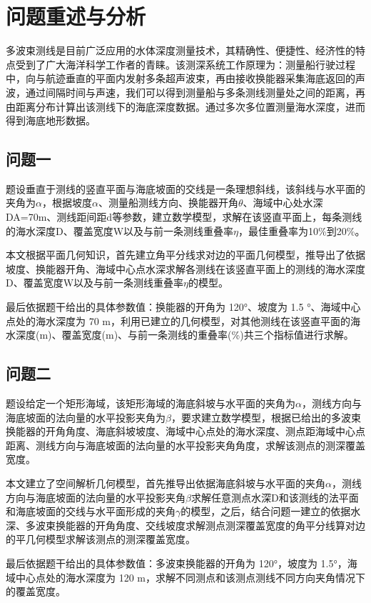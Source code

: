 \documentclass[withoutpreface,bwprint]{cumcmthesis} %
\begin{document}
\setcounter{page}{1}
\section{问题重述与分析}
多波束测线是目前广泛应用的水体深度测量技术，其精确性、便捷性、经济性的特点受到了广大海洋科学工作者的青睐。该测深系统工作原理为：测量船行驶过程中，向与航迹垂直的平面内发射多条超声波束，再由接收换能器采集海底返回的声波，通过间隔时间与声速，我们可以得到测量船与多条测线测量处之间的距离，再由距离分布计算出该测线下的海底深度数据。通过多次多位置测量海水深度，进而得到海底地形数据。

\subsection{问题一}
题设垂直于测线的竖直平面与海底坡面的交线是一条理想斜线，该斜线与水平面的夹角为$\alpha$，根据坡度$\alpha$、测量船测线方向、换能器开角$\theta$、海域中心处水深DA=70m、测线距间距d等参数，建立数学模型，求解在该竖直平面上，每条测线的海水深度D、覆盖宽度W以及与前一条测线重叠率$\eta$，最佳重叠率为10\%到20\%。

本文根据平面几何知识，首先建立角平分线求对边的平面几何模型，推导出了依据坡度、换能器开角、海域中心点水深求解各测线在该竖直平面上的测线的海水深度D、覆盖宽度W以及与前一条测线重叠率$\eta$的模型。

最后依据题干给出的具体参数值：换能器的开角为 120°、坡度为 1.5 °、海域中心点处的海水深度为 70 m，利用已建立的几何模型，对其他测线在该竖直平面的海水深度(m)、覆盖宽度(m)、与前一条测线的重叠率(\%)共三个指标值进行求解。

\subsection{问题二}
题设给定一个矩形海域，该矩形海域的海底斜坡与水平面的夹角为$\alpha$，测线方向与海底坡面的法向量的水平投影夹角为$\beta$，要求建立数学模型，根据已给出的多波束换能器的开角角度、海底斜坡坡度、海域中心点处的海水深度、测点距海域中心点距离、测线方向与海底坡面的法向量的水平投影夹角角度，求解该测点的测深覆盖宽度。

本文建立了空间解析几何模型，首先推导出依据海底斜坡与水平面的夹角$\alpha$，测线方向与海底坡面的法向量的水平投影夹角$\beta$求解任意测点水深D和该测线的法平面和海底坡面的交线与水平面形成的夹角$\gamma$的模型，之后，结合问题一建立的依据水深、多波束换能器的开角角度、交线坡度求解测点测深覆盖宽度的角平分线算对边的平几何模型求解该测点的测深覆盖宽度。

最后依据题干给出的具体参数值：多波束换能器的开角为 120°，坡度为 1.5°，海域中心点处的海水深度为 120 m，求解不同测点和该测点测线不同方向夹角情况下的覆盖宽度。
\end{document}
